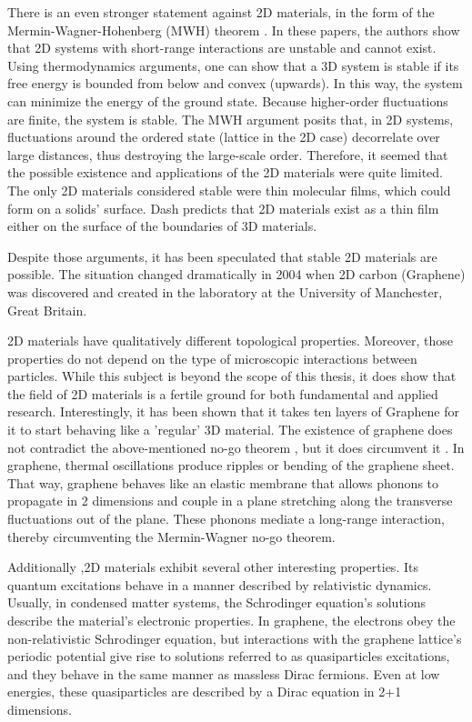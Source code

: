 There is an even stronger statement against 2D materials, in the form of the Mermin-Wagner-Hohenberg (MWH) theorem \cite{Hohenberg}\cite{Mermin2}. In these papers, the authors show that 2D systems with short-range interactions are unstable and cannot exist.  Using thermodynamics arguments, one can show that a 3D system is stable if its free energy is bounded from below and convex (upwards). In this way, the system can minimize the energy of the ground state. Because higher-order fluctuations are finite, the system is stable.
The MWH argument posits that, in 2D systems, fluctuations around the ordered state (lattice in the 2D case) decorrelate over large distances, thus destroying the large-scale order. 
Therefore, it seemed that the possible existence and applications of the 2D materials were quite limited. The only 2D materials considered stable were thin molecular films, which could form on a solids' surface. Dash\cite{2DMatter1} predicts that 2D materials exist as a thin film either on the surface of the boundaries of 3D materials.

Despite those arguments, it has been speculated that stable 2D materials are possible\cite{2DMatter1}. The situation changed dramatically in 2004 when 2D carbon (Graphene) was discovered and created in the laboratory\cite{Graphene0, GrapheneN} at the University of Manchester, Great Britain. 

2D materials have qualitatively different topological properties\cite{2DMatterCurvature}. Moreover, those properties do not depend on the type of microscopic interactions between particles. While this subject is beyond the scope of this thesis, it does show that the field of 2D materials is a fertile ground for both fundamental and applied research. Interestingly, it has been shown \cite{GraphLayers} that it takes ten layers of Graphene for it to start behaving like a 'regular' 3D material.  
The existence of graphene does not contradict the above-mentioned no-go theorem \cite{Mermin2}, but it does circumvent it \cite{GrapheneRiples}. In graphene, thermal oscillations produce ripples or bending of the graphene sheet. That way, graphene behaves like an elastic membrane that allows phonons to propagate in 2 dimensions and couple in a plane stretching along the transverse fluctuations out of the plane. These phonons mediate a long-range interaction, thereby circumventing the Mermin-Wagner no-go theorem. 

Additionally \cite{Graphene0},2D materials exhibit several other interesting properties. Its quantum excitations behave in a manner described by relativistic dynamics. Usually, in condensed matter systems, the Schrodinger equation's solutions describe the material's electronic properties. In graphene, the electrons obey the non-relativistic Schrodinger equation, but interactions with the graphene lattice's periodic potential give rise to solutions referred to as quasiparticles excitations, and they behave in the same manner as massless Dirac fermions. Even at low energies, these quasiparticles are described by a Dirac equation in 2+1 dimensions.  

